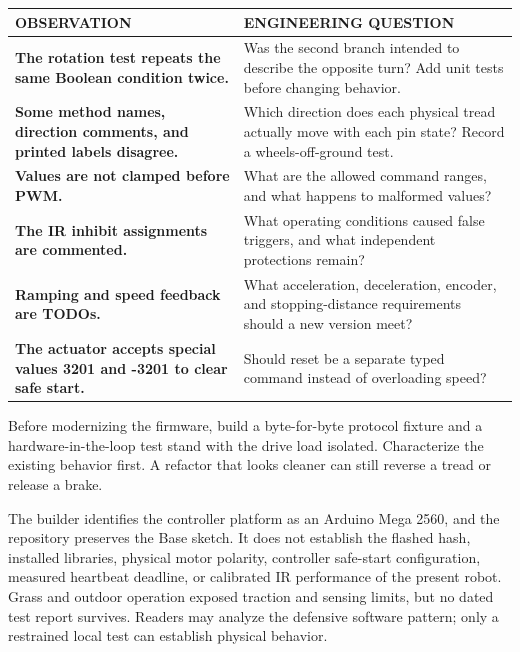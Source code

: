 \documentclass[11pt,openany]{book}
\begin{document}
\begin{tabularx}{\textwidth}{>{\robcondensed\bfseries\color{ROBAccent}}p{1.45in} X}
\toprule
OBSERVATION & ENGINEERING QUESTION\\
\midrule
The rotation test repeats the same Boolean condition twice. & Was the second branch intended to describe the opposite turn? Add unit tests before changing behavior.\\
Some method names, direction comments, and printed labels disagree. & Which direction does each physical tread actually move with each pin state? Record a wheels-off-ground test.\\
Values are not clamped before PWM. & What are the allowed command ranges, and what happens to malformed values?\\
The IR inhibit assignments are commented. & What operating conditions caused false triggers, and what independent protections remain?\\
Ramping and speed feedback are TODOs. & What acceleration, deceleration, encoder, and stopping-distance requirements should a new version meet?\\
The actuator accepts special values 3201 and -3201 to clear safe start. & Should reset be a separate typed command instead of overloading speed?\\
\bottomrule
\end{tabularx}

\begin{advancedbox}
Before modernizing the firmware, build a byte-for-byte protocol fixture and a hardware-in-the-loop test stand with the drive load isolated. Characterize the existing behavior first. A refactor that looks cleaner can still reverse a tread or release a brake.
\end{advancedbox}

\begin{fieldnotebox}[title={WHAT THE RECORD CAN AND CANNOT ESTABLISH}]
The builder identifies the controller platform as an Arduino Mega 2560, and the repository preserves the Base sketch. It does not establish the flashed hash, installed libraries, physical motor polarity, controller safe-start configuration, measured heartbeat deadline, or calibrated IR performance of the present robot. Grass and outdoor operation exposed traction and sensing limits, but no dated test report survives. Readers may analyze the defensive software pattern; only a restrained local test can establish physical behavior.
\end{fieldnotebox}
\end{document}
